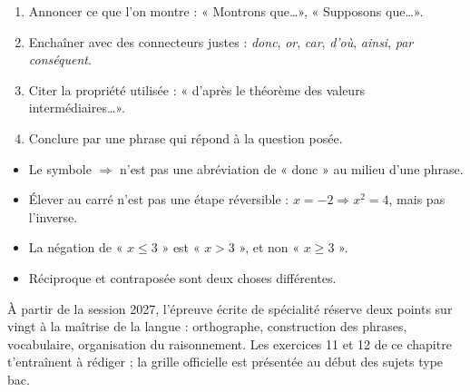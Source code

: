 \noindent
\begin{minipage}[t]{0.5\linewidth}\vspace{0pt}
\begin{savoirfaire}
\raggedright
\begin{enumerate}[leftmargin=1.3em,itemsep=0.4mm,topsep=0.5mm,label={\color{otGreenDark}\arabic*.}]
  \item Annoncer ce que l'on montre : « Montrons que\dots », « Supposons que\dots ».
  \item Enchaîner avec des connecteurs justes : \emph{donc}, \emph{or}, \emph{car}, \emph{d'où}, \emph{ainsi}, \emph{par conséquent}.
  \item Citer la propriété utilisée : « d'après le théorème des valeurs intermédiaires\dots ».
  \item Conclure par une phrase qui répond à la question posée.
\end{enumerate}
\end{savoirfaire}
\end{minipage}\hfill
\begin{minipage}[t]{0.46\linewidth}\vspace{0pt}
\begin{attention}
\raggedright
\begin{itemize}[label={\color{otOrange}\textbullet},leftmargin=1.2em,itemsep=0.5mm,topsep=0.5mm]
  \item Le symbole $\Rightarrow$ n'est pas une abréviation de « donc » au milieu d'une phrase.
  \item Élever au carré n'est pas une étape réversible : $x=-2\Rightarrow x^{2}=4$, mais pas l'inverse.
  \item La négation de « $x\leq3$ » est « $x>3$ », et non « $x\geq3$ ».
  \item Réciproque et contraposée sont deux choses différentes.
\end{itemize}
\end{attention}
\end{minipage}

\begin{exemple}
À partir de la session 2027, l'épreuve écrite de spécialité réserve deux points sur vingt à la maîtrise de la langue :
orthographe, construction des phrases, vocabulaire, organisation du raisonnement. Les exercices 11 et 12 de ce chapitre
t'entraînent à rédiger ; la grille officielle est présentée au début des sujets type bac.
\end{exemple}

